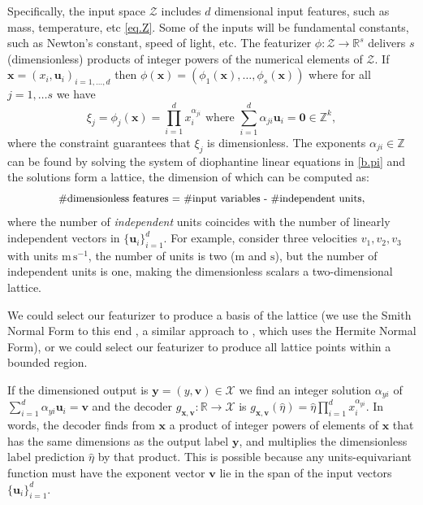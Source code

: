 \documentclass[twoside,11pt]{article}
\newcommand{\unit}[1]{\mathrm{#1}}
\newcommand{\m}{\unit{m}}
\newcommand{\s}{\unit{s}}
\begin{document}
Specifically, the input space $\mathcal Z$ includes $d$ dimensional input features, such as mass, temperature, etc \eqref{eq.Z}. Some of the inputs will be fundamental constants, such as Newton's constant, speed of light, etc. 
The featurizer $\phi: \mathcal Z \to \mathbb R^s$ delivers $s$ (dimensionless) products of integer powers of the numerical elements of $\mathcal Z$.
If $\mathbf x=(x_i, \mathbf u_i)_{i=1, \ldots, d}$ then $\phi(\mathbf x) =(\phi_1(\mathbf x), \ldots, \phi_s(\mathbf x))$ where for all $j=1,\ldots s$ we have 
\begin{equation} \label{b.pi}
\xi_j=\phi_j(\mathbf x)= \prod_{i=1}^{d} x_i^{\alpha_{ji}} \text{ where }  \sum_{i=1}^{d} \alpha_{ji} \mathbf u_i =\mathbf 0 \in \mathbb Z^k,
\end{equation}
where the constraint guarantees that $\xi_j$ is dimensionless.
The exponents $\alpha_{ji} \in \mathbb Z$ can be found by solving the system of diophantine linear equations in \eqref{b.pi} and the solutions form a lattice, the dimension of which can be computed as:
\begin{equation}
\small
    \text{$\#$dimensionless features = $\#$input variables - $\#$independent units},
\end{equation}
where the number of \emph{independent} units coincides with the number of linearly independent vectors in $\{\mathbf u_i\}_{i=1}^d$. For example, consider three velocities $v_1,v_2,v_3$ with units $\m\,\s^{-1}$, the number of units is two ($\m $ and $\s$), but the number of independent units is one, making the dimensionless scalars a two-dimensional lattice. 

We could select our featurizer to produce a basis of the lattice (we use the Smith Normal Form to this end \citep{stanley2016smithnormalform}, a similar approach to \citep{hubert2012rational}, which uses the Hermite Normal Form), or we could select our featurizer to produce all lattice points within a bounded region. 

If the dimensioned output is $\mathbf y = (y, \mathbf v) \in \mathcal X$ we find an integer solution $\alpha_{yi}$ of $\sum_{i=1}^{d} \alpha_{yi} \mathbf u_i =\mathbf v$ and the decoder $g_{\mathbf x, \mathbf v}:\mathbb R \to \mathcal X$ is $g_{\mathbf x, \mathbf v}(\hat\eta) = \hat\eta \prod_{i=1}^{d} x_i^{\alpha_{yi}}$.
In words, the decoder finds from $\mathbf x$ a product of integer powers of elements of $\mathbf x$ that has the same dimensions as the output label $\mathbf y$, and multiplies the dimensionless label prediction $\hat{\eta}$ by that product.
This is possible because any units-equivariant function must have the exponent vector $\mathbf v$ lie in the span of the input vectors $\{\mathbf u_i\}_{i=1}^d$.
\end{document}
